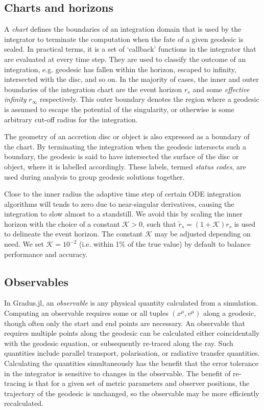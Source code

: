 \documentclass[fleqn,usenatbib]{mnras}
\newcommand{\Gradus}{{\sc Gradus.jl}\xspace}
\begin{document}
\subsection{Charts and horizons}

A \emph{chart} defines the boundaries of an integration domain that is used by
the integrator to terminate the computation when the fate of a given geodesic is
sealed. In practical terms, it is a set of `callback' functions in the
integrator that are evaluated at every time step. They are used to classify the
outcome of an integration, e.g. geodesic has fallen within the horizon, escaped
to infinity, intersected with the disc, and so on. In the majority of cases, the
inner and outer boundaries of the integration chart are the event horizon $r_s$
and some \emph{effective infinity} $r_\infty$ respectively. This outer boundary
denotes the region where a geodesic is assumed to escape the potential of the
singularity, or otherwise is some arbitrary cut-off radius for the integration.

The geometry of an accretion disc or object is also expressed as a boundary of
the chart. By terminating the integration when the geodesic intersects such a
boundary, the geodesic is said to have intersected the surface of the disc or
object, where it is labelled accordingly. These labels, termed \emph{status
codes}, are used during analysis to group geodesic solutions together.

Close to the inner radius the adaptive time step of certain ODE integration
algorithms will tends to zero due to near-singular derivatives, causing the
integration to slow almost to a standstill. We avoid this by scaling the inner
horizon with the choice of a constant $\mathcal{K} > 0$, such that $\tilde{r}_s
= (1 + \mathcal{K}) r_s$ is used to delineate the event horizon.  The constant
$\mathcal{K}$ may be adjusted depending on need. We set $\mathcal{K} = 10^{-2}$
(i.e. within 1\% of the true value) by default to balance performance and
accuracy.

\subsection{Observables}
\label{sec:computing-observables}

In \Gradus, an \textit{observable} is any physical quantity calculated from a
simulation. Computing an observable requires some or all tuples $(x^\mu, v^\mu)$
along a geodesic, though often only the start and end points are necessary. An
observable that requires multiple points along the geodesic can be calculated
either coincidentally with the geodesic equation, or subsequently re-traced
along the ray. Such quantities include parallel transport, polarisation, or
radiative transfer quantities.  Calculating the quantities simultaneously has
the benefit that the error tolerance in the integrator is sensitive to changes
in the observable. The benefit of re-tracing is that for a given set of metric
parameters and observer positions, the trajectory of the geodesic is unchanged,
so the observable may be more efficiently recalculated.
\end{document}
